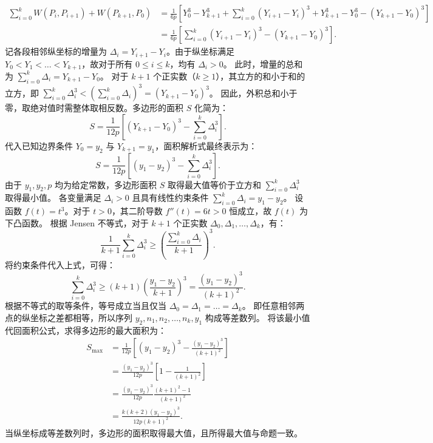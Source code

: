 \begin{solution}
\begin{align*}
\sum_{i=0}^k W(P_i, P_{i+1}) + W(P_{k+1}, P_0) &= \frac{1}{6p} \left[ Y_0^3 - Y_{k+1}^3 + \sum_{i=0}^k (Y_{i+1} - Y_i)^3 + Y_{k+1}^3 - Y_0^3 - (Y_{k+1} - Y_0)^3 \right] \\
&= \frac{1}{6p} \left[ \sum_{i=0}^k (Y_{i+1} - Y_i)^3 - (Y_{k+1} - Y_0)^3 \right].
\end{align*}
记各段相邻纵坐标的增量为 $\Delta_i = Y_{i+1} - Y_i$。由于纵坐标满足 $Y_0 < Y_1 < \dots < Y_{k+1}$，故对于所有 $0 \le i \le k$，均有 $\Delta_i > 0$。
此时，增量的总和为 $\sum_{i=0}^k \Delta_i = Y_{k+1} - Y_0$。
对于 $k+1$ 个正实数（$k \ge 1$），其立方的和小于和的立方，即 $\sum_{i=0}^k \Delta_i^3 < \left( \sum_{i=0}^k \Delta_i \right)^3 = (Y_{k+1} - Y_0)^3$。
因此，外积总和小于零，取绝对值时需整体取相反数。多边形的面积 $S$ 化简为：
\[ S = \frac{1}{12p} \left[ (Y_{k+1} - Y_0)^3 - \sum_{i=0}^k \Delta_i^3 \right]. \]
代入已知边界条件 $Y_0 = y_2$ 与 $Y_{k+1} = y_1$，面积解析式最终表示为：
\[ S = \frac{1}{12p} \left[ (y_1 - y_2)^3 - \sum_{i=0}^k \Delta_i^3 \right]. \]
由于 $y_1, y_2, p$ 均为给定常数，多边形面积 $S$ 取得最大值等价于立方和 $\sum_{i=0}^k \Delta_i^3$ 取得最小值。
各变量满足 $\Delta_i > 0$ 且具有线性约束条件 $\sum_{i=0}^k \Delta_i = y_1 - y_2$。
设函数 $f(t) = t^3$。对于 $t > 0$，其二阶导数 $f''(t) = 6t > 0$ 恒成立，故 $f(t)$ 为下凸函数。
根据 Jensen 不等式，对于 $k+1$ 个正实数 $\Delta_0, \Delta_1, \dots, \Delta_k$，有：
\[ \frac{1}{k+1} \sum_{i=0}^k \Delta_i^3 \ge \left( \frac{\sum_{i=0}^k \Delta_i}{k+1} \right)^3. \]
将约束条件代入上式，可得：
\[ \sum_{i=0}^k \Delta_i^3 \ge (k+1) \left( \frac{y_1 - y_2}{k+1} \right)^3 = \frac{(y_1 - y_2)^3}{(k+1)^2}. \]
根据不等式的取等条件，等号成立当且仅当 $\Delta_0 = \Delta_1 = \dots = \Delta_k$。
即任意相邻两点的纵坐标之差都相等，所以序列 $y_2, n_1, n_2, \dots, n_k, y_1$ 构成等差数列。
将该最小值代回面积公式，求得多边形的最大面积为：
\begin{align*}
S_{\max} &= \frac{1}{12p} \left[ (y_1 - y_2)^3 - \frac{(y_1 - y_2)^3}{(k+1)^2} \right] \\
&= \frac{(y_1 - y_2)^3}{12p} \left[ 1 - \frac{1}{(k+1)^2} \right] \\
&= \frac{(y_1 - y_2)^3}{12p} \frac{(k+1)^2 - 1}{(k+1)^2} \\
&= \frac{k(k+2)(y_1 - y_2)^3}{12p(k+1)^2}.
\end{align*}
当纵坐标成等差数列时，多边形的面积取得最大值，且所得最大值与命题一致。
\end{solution}


